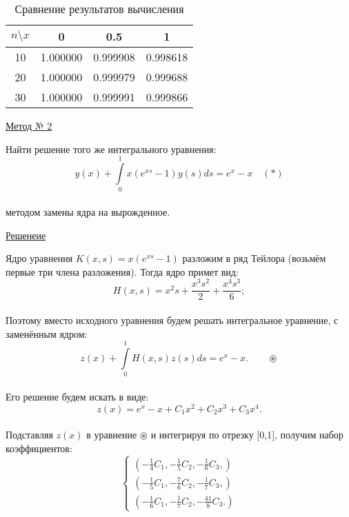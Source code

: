 \documentclass[12pt]{article}
\begin{document}
\renewcommand{\arraystretch}{1.8} %
\renewcommand{\tabcolsep}{0.5cm}   %
\begin{table}[h!]
	\caption{\label{tab:canonsummary} Сравнение результатов вычисления}
	\begin{center}
		\begin{tabular}{|c|c|c|c|}
			\hline
			$ n \setminus x $ & 0 & 0.5 & 1\\
			\hline
			10 & 1.000000 & 0.999908 & 0.998618 \\
						\hline
			20 & 1.000000 & 0.999979 & 0.999688 \\
						\hline
			30 & 1.000000 & 0.999991 & 0.999866 \\
			\hline
		\end{tabular}
	\end{center}
\end{table} 

\newpage
\begin{center}
	\underline{Метод № 2}\\
	\begin{center}
		Найти решение того же интегрального уравнения:\\
		$$ y(x) + \int\limits_0^1 x(e^{xs}-1)y(s) ds = e^{x} - x  \quad  (\ast)$$\\
		методом замены ядра на вырожденное. 	
	\end{center}	
	\underline{Решенеие}\\
\end{center}

Ядро уравнения $ K(x,s) = x(e^{xs}-1) $ разложим в ряд Тейлора (возьмём первые три члена разложения). Тогда ядро примет вид:\\
$$ H(x,s) = x^2s + \frac{x^3s^2}{2} + \frac{x^4s^3}{6} ; $$\\

Поэтому вместо исходного уравнения будем решать интегральное уравнение, с заменённым ядром:\\
$$ z(x) + \int\limits_0^1 H(x,s)z(s)ds = e^x - x . \qquad \circledast$$\\
Его решение будем искать в виде:\\
$$ z(x) = e^x - x + C_1x^2 + C_2x^3 + C_3x^4 . $$\\

Подставляя $ z(x) $ в уравнение $ \circledast $ и интегрируя по отрезку [0,1], получим набор коэффициентов:\\

\begin{equation*}
\begin{cases}
(-\frac{1}{4}C_1 , - \frac{1}{5}C_2, - \frac{1}{6}C_3,) \\ 
(-\frac{1}{5}C_1, - \frac{7}{6}C_2, - \frac{1}{7}C_3,)\\
(-\frac{1}{6}C_1, - \frac{1}{7}C_2, - \frac{41}{8}C_3.)
\end{cases}
\end{equation*}\\
\end{document}
